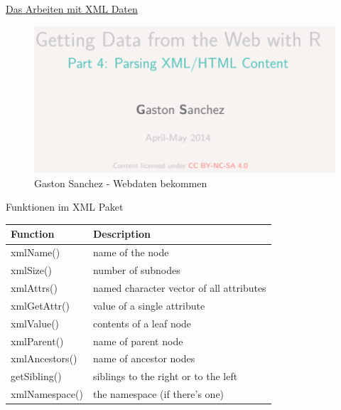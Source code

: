 \documentclass[ignorenonframetext,]{beamer}
\begin{document}
\begin{frame}{\href{https://github.com/gastonstat/tutorial-R-web-data/blob/master/04-parsing-xml/04-parsing-xml.pdf}{Das
Arbeiten mit XML Daten}}
\protect\hypertarget{das-arbeiten-mit-xml-daten}{}

\begin{figure}
\centering
\includegraphics{figure/GastonSanchez3.PNG}
\caption{Gaston Sanchez - Webdaten bekommen}
\end{figure}

\end{frame}

\begin{frame}{Funktionen im XML Paket}
\protect\hypertarget{funktionen-im-xml-paket}{}

\begin{longtable}[]{@{}ll@{}}
\toprule
Function & Description\tabularnewline
\midrule
\endhead
xmlName() & name of the node\tabularnewline
xmlSize() & number of subnodes\tabularnewline
xmlAttrs() & named character vector of all attributes\tabularnewline
xmlGetAttr() & value of a single attribute\tabularnewline
xmlValue() & contents of a leaf node\tabularnewline
xmlParent() & name of parent node\tabularnewline
xmlAncestors() & name of ancestor nodes\tabularnewline
getSibling() & siblings to the right or to the left\tabularnewline
xmlNamespace() & the namespace (if there's one)\tabularnewline
\bottomrule
\end{longtable}

\end{frame}
\end{document}
